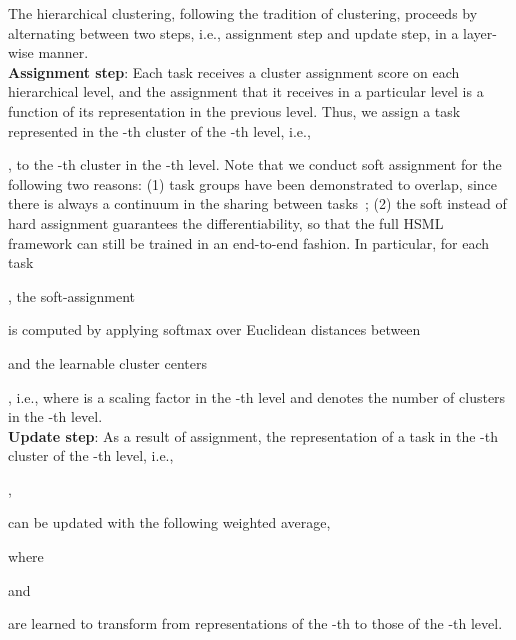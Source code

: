 \documentclass{article}
\begin{document}
The hierarchical clustering, following the tradition of clustering, proceeds by alternating between two steps, i.e., 
assignment step and update step, in a layer-wise manner. \\
\textbf{Assignment step}: 
Each task receives a cluster assignment score on each hierarchical level, and the assignment that it receives in a particular level is a function of its representation in the previous level. Thus, we assign a task represented in the -th cluster of the -th level, i.e., 
\begin{small}

\end{small},
to the -th cluster in the -th level.
Note that we conduct soft assignment for the following two reasons: (1) task groups have been demonstrated to overlap, since there is always a continuum in the sharing between tasks~\cite{kumar2012learning}; (2) the soft instead of hard assignment guarantees the differentiability, so that the full HSML
framework can still be trained in an end-to-end fashion. In particular, for each task \begin{small}\end{small}, the soft-assignment \begin{small}\end{small} is computed by
applying softmax over Euclidean distances between \begin{small}

\end{small} and the learnable cluster centers \begin{small}\end{small}, i.e., 
where  is a scaling factor in the -th level and   denotes the number of clusters in the -th level. 
\\
\textbf{Update step}: 
As a result of assignment, the representation of a task in the -th cluster of the -th level, i.e., 
\begin{small}
,
\end{small}
can be updated with the following weighted average,

where \begin{small}\end{small} and \begin{small}\end{small} are learned to transform from representations of the -th to those of the -th level.
\end{document}

